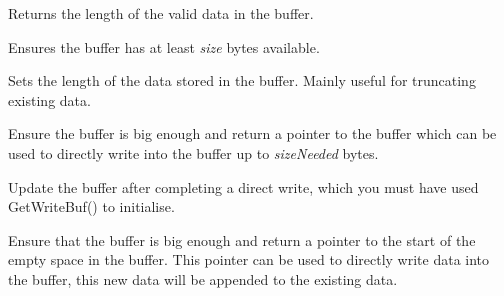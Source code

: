 Returns the length of the valid data in the buffer.

\label{wxmemorybuffersetbufsize}


Ensures the buffer has at least {\it size} bytes available.

\label{wxmemorybuffersetdatalen}


Sets the length of the data stored in the buffer.  Mainly useful for truncating existing data.


\label{wxmemorybuffergetwritebuf}


Ensure the buffer is big enough and return a pointer to the
buffer which can be used to directly write into the buffer
up to {\it sizeNeeded} bytes.

\label{wxmemorybufferungetwritebuf}


Update the buffer after completing a direct write, which
you must have used GetWriteBuf() to initialise.


\label{wxmemorybuffergetappendbuf}


Ensure that the buffer is big enough and return a pointer to the start
of the empty space in the buffer. This pointer can be used to directly 
write data into the buffer, this new data will be appended to
the existing data.


\label{wxmemorybufferungetappendbuf}


